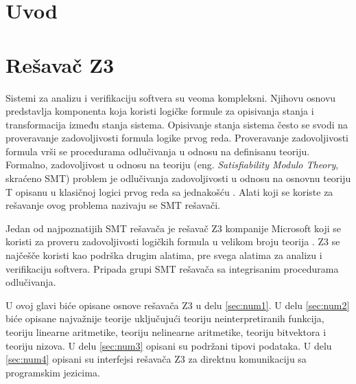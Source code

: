 \documentclass[12pt,oneside]{memoir}
\begin{document}
\frontmatter
\naslovna
\komisija
\apstrakt
\tableofcontents*

\mainmatter

\chapter{Uvod}


\chapter{Rešavač Z3}
\label{chp:razrada}

Sistemi za analizu i verifikaciju softvera su veoma kompleksni. Njihovu osnovu predstavlja komponenta koja koristi logičke formule za opisivanja stanja i transformacija između stanja sistema. Opisivanje stanja sistema često se svodi na proveravanje zadovoljivosti formula logike prvog reda. 
Proveravanje zadovoljivosti formula vrši se procedurama odlučivanja u odnosu na definisanu teoriju. Formalno, zadovoljivost u odnosu na teoriju (eng. \textit{Satisfiability Modulo Theory}, skraćeno SMT) problem je odlučivanja zadovoljivosti u odnosu na osnovnu teoriju T opisanu u klasičnoj logici prvog reda sa jednakošću \cite{Barrett}. Alati koji se koriste za rešavanje ovog problema nazivaju se SMT rešavači. 
\par

Jedan od najpoznatijih SMT rešavača je rešavač Z3 kompanije Microsoft koji se koristi za proveru zadovoljivosti logičkih formula u velikom broju teorija \cite{EfficientSMTSolver}. Z3 se najčešče koristi kao podrška drugim alatima, pre svega alatima za analizu i verifikaciju softvera. Pripada grupi SMT rešavača sa integrisanim procedurama odlučivanja.
\par
U ovoj glavi biće opisane osnove rešavača Z3 u delu \ref{sec:num1}. U delu \ref{sec:num2} biće opisane najvažnije teorije uključujući teoriju neinterpretiranih funkcija, teoriju linearne aritmetike, teoriju nelinearne aritmetike, teoriju bitvektora i teoriju nizova. U delu \ref{sec:num3} opisani su podržani tipovi podataka. U delu \ref{sec:num4} opisani su interfejsi rešavača Z3 za direktnu komunikaciju sa programskim jezicima.  
\end{document}

